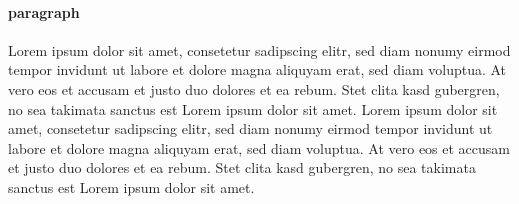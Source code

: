 \documentclass{breakthebox}
\begin{document}
\paragraph{paragraph}
Lorem ipsum dolor sit amet, consetetur sadipscing elitr, sed diam nonumy eirmod tempor invidunt ut labore et dolore magna aliquyam erat, sed diam voluptua. At vero eos et accusam et justo duo dolores et ea rebum. Stet clita kasd gubergren, no sea takimata sanctus est Lorem ipsum dolor sit amet. Lorem ipsum dolor sit amet, consetetur sadipscing elitr, sed diam nonumy eirmod tempor invidunt ut labore et dolore magna aliquyam erat, sed diam voluptua. At vero eos et accusam et justo duo dolores et ea rebum. Stet clita kasd gubergren, no sea takimata sanctus est Lorem ipsum dolor sit amet.
\end{document}

